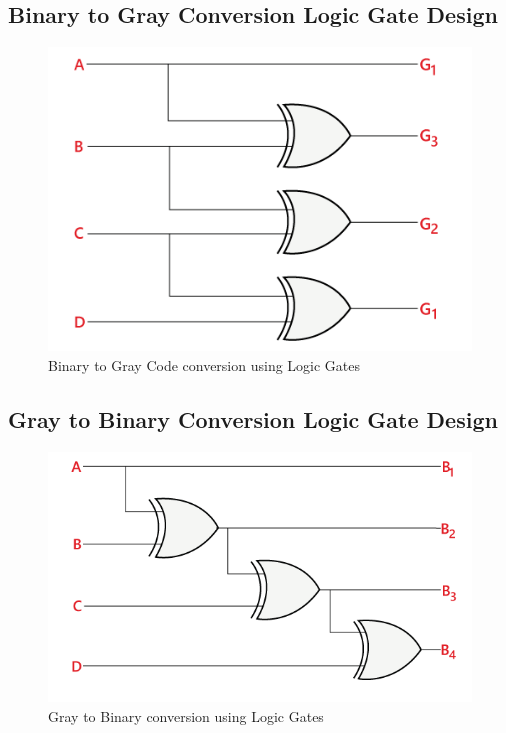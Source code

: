 \documentclass[11pt]{article}
\begin{document}
\subsection{Binary to Gray Conversion Logic Gate Design}
\begin{figure}[H]
	\centering
	\includegraphics[scale=0.5]{binary_to_gray.png}
	\caption{Binary to Gray Code conversion using Logic Gates}
\end{figure}

\subsection{Gray to Binary Conversion Logic Gate Design}
\begin{figure}[H]
	\centering
	\includegraphics[scale=0.5]{gray_to_binary.png}
	\caption{Gray to Binary conversion using Logic Gates}
\end{figure}
\end{document}
